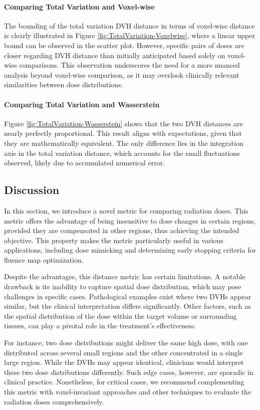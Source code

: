 \paragraph{Comparing Total Variation and Voxel-wise}
The bounding of the total variation DVH distance in terms of voxel-wise distance is clearly illustrated in Figure \ref{fig:TotalVariation-Voxelwise}, where a linear upper bound can be observed in the scatter plot.
However, specific pairs of doses are closer regarding DVH distance than initially anticipated based solely on voxel-wise comparisons.
This observation underscores the need for a more nuanced analysis beyond voxel-wise comparison, as it may overlook clinically relevant similarities between dose distributions.

\paragraph{Comparing Total Variation and Wasserstein}
Figure \ref{fig:TotalVariation-Wasserstein} shows that the two DVH distances are nearly perfectly proportional.
This result aligns with expectations, given that they are mathematically equivalent.
The only difference lies in the integration axis in the total variation distance, which accounts for the small fluctuations observed, likely due to accumulated numerical error.

\subsection{Discussion}
In this section, we introduce a novel metric for comparing radiation doses.
This metric offers the advantage of being insensitive to dose changes in certain regions, provided they are compensated in other regions, thus achieving the intended objective.
This property makes the metric particularly useful in various applications, including dose mimicking and determining early stopping criteria for fluence map optimization.

Despite the advantages, this distance metric has certain limitations.
A notable drawback is its inability to capture spatial dose distribution, which may pose challenges in specific cases.
Pathological examples exist where two DVHs appear similar, but the clinical interpretation differs significantly.
Other factors, such as the spatial distribution of the dose within the target volume or surrounding tissues, can play a pivotal role in the treatment’s effectiveness. 

For instance, two dose distributions might deliver the same high dose, with one distributed across several small regions and the other concentrated in a single large region.
While the DVHs may appear identical, clinicians would interpret these two dose distributions differently.
Such edge cases, however, are sporadic in clinical practice.
Nonetheless, for critical cases, we recommend complementing this metric with voxel-invariant approaches and other techniques to evaluate the radiation doses comprehensively.

